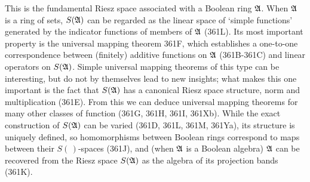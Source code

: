 
\def\chaptername{Function spaces}
\def\sectionname{$S$}


This is the fundamental Riesz space associated with a Boolean ring
$\frak A$.   When $\frak A$ is a ring of sets, $S(\frak A)$ can be
regarded as the linear space of `simple functions' generated by the
indicator functions of members of $\frak A$ (361L).   Its most
important property is the universal mapping theorem 361F, which
establishes a one-to-one correspondence between (finitely) additive
functions on $\frak A$ (361B-361C) and linear operators on $S(\frak A)$.
Simple universal mapping theorems of this type can be interesting, but
do not by themselves lead to new insights;  what makes this one
important is the fact that $S(\frak A)$ has a canonical Riesz space
structure, norm and multiplication (361E).   From this we can deduce
universal mapping theorems for many other classes of function (361G,
361H, 361I, 361Xb).
   While the exact construction of
$S(\frak A)$ can be
varied (361D, 361L, 361M, 361Ya), its structure is uniquely defined, so
homomorphisms between Boolean rings correspond to maps between their
$S(\,)$-spaces (361J), and (when $\frak A$ is a
Boolean algebra) $\frak A$ can be recovered from the
Riesz space $S(\frak A)$ as the algebra of its projection bands (361K).

